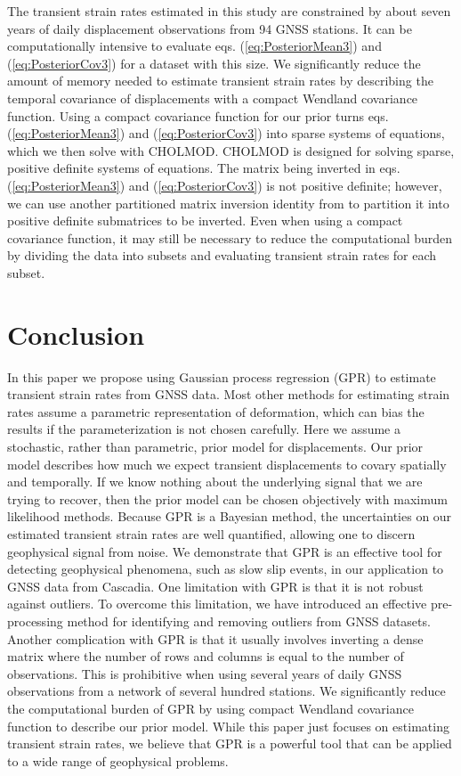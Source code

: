 \documentclass[extra,mreferee]{gji}
\begin{document}
The transient strain rates estimated in this study are constrained by about seven years of daily displacement observations from 94 GNSS stations. It can be computationally intensive to evaluate eqs. (\ref{eq:PosteriorMean3}) and (\ref{eq:PosteriorCov3}) for a dataset with this size. We significantly reduce the amount of memory needed to estimate transient strain rates by describing the temporal covariance of displacements with a compact Wendland covariance function. Using a compact covariance function for our prior turns eqs. (\ref{eq:PosteriorMean3}) and (\ref{eq:PosteriorCov3}) into sparse systems of equations, which we then solve with CHOLMOD. CHOLMOD is designed for solving sparse, positive definite systems of equations. The matrix being inverted in eqs. (\ref{eq:PosteriorMean3}) and (\ref{eq:PosteriorCov3}) is not positive definite; however, we can use another partitioned matrix inversion identity from \citet{Press2007} to partition it into positive definite submatrices to be inverted. Even when using a compact covariance function, it may still be necessary to reduce the computational burden by dividing the data into subsets and evaluating transient strain rates for each subset.   

\section{Conclusion}\label{sec:Conclusion}
In this paper we propose using Gaussian process regression (GPR) to estimate transient strain rates from GNSS data. Most other methods for estimating strain rates assume a parametric representation of deformation, which can bias the results if the parameterization is not chosen carefully. Here we assume a stochastic, rather than parametric, prior model for displacements. Our prior model describes how much we expect transient displacements to covary spatially and temporally. If we know nothing about the underlying signal that we are trying to recover, then the prior model can be chosen objectively with maximum likelihood methods. Because GPR is a Bayesian method, the uncertainties on our estimated transient strain rates are well quantified, allowing one to discern geophysical signal from noise. We demonstrate that GPR is an effective tool for detecting geophysical phenomena, such as slow slip events, in our application to GNSS data from Cascadia. One limitation with GPR is that it is not robust against outliers. To overcome this limitation, we have introduced an effective pre-processing method for identifying and removing outliers from GNSS datasets. Another complication with GPR is that it usually involves inverting a dense matrix where the number of rows and columns is equal to the number of observations. This is prohibitive when using several years of daily GNSS observations from a network of several hundred stations. We significantly reduce the computational burden of GPR by using compact Wendland covariance function to describe our prior model. While this paper just focuses on estimating transient strain rates, we believe that GPR is a powerful tool that can be applied to a wide range of geophysical problems.   
\end{document}
